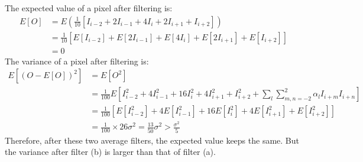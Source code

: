 \documentclass[12pt]{article}
\begin{document}
The expected value of a pixel after filtering is:
\begin{equation*}
\begin{aligned}
E[O] &= E\left(\frac{1}{10}\left[I_{i-2} + 2I_{i-1} + 4I_{i} + 2I_{i+1} + I_{i+2}\right]\right)\\
&= \frac{1}{10}\left[E[I_{i-2}] + E[2I_{i-1}] + E[4I_{i}] + E[2I_{i+1}] + E[I_{i+2}] \right] \\
&= 0
\end{aligned}
\end{equation*}
The variance of a pixel after filtering is:
\begin{equation*}
\begin{aligned}
E[(O-E[O])^2] &= E[O^2] \\
&=\frac{1}{100}E\left[ I^2_{i-2} + 4I^2_{i-1} + 16I^2_{i} + 4I^2_{i+1} + I^2_{i+2} +\sum_l\sum^2_{m,n = -2}\alpha_lI_{i+m}I_{i+n} \right]\\
&=\frac{1}{100}\left[ E[I^2_{i-2}] + 4E[I^2_{i-1}] + 16E[I^2_{i}] + 4E[I^2_{i+1}] + E[I^2_{i+2}] \right]\\
&=\frac{1}{100}\times26\sigma^2=\frac{13}{50}\sigma^2> \frac{\sigma^2}{5}
\end{aligned}
\end{equation*}
Therefore, after these two average filters, the expected value keeps the same. But the variance after filter (b) is larger than that of filter (a).
\end{document}
